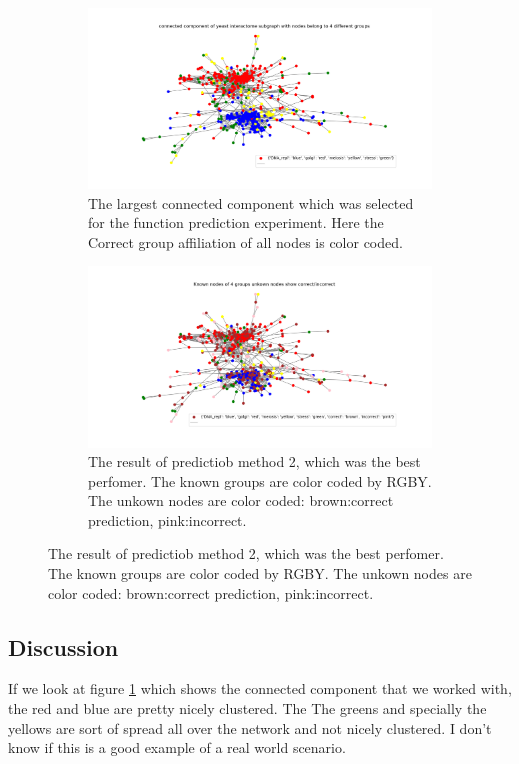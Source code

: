 \documentclass[a4paper,10pt]{article}
\theoremstyle{definition}
\theoremstyle{remark}
\theoremstyle{plain}
\begin{document}
\begin{figure}
\centering
\begin{subfigure}[b]{\textwidth}
\includegraphics[width=\textwidth]{connected component of yeast interactome subgraph with nodes belong to 4 different groups.png}
\caption{The largest connected component which was selected for the function
prediction experiment. Here the Correct group affiliation of all nodes is color
coded.}
\label{fig:largest_connected_comp}
\end{subfigure}
\begin{subfigure}[b]{\textwidth}
\includegraphics[width=\textwidth]{method2_true_false_clustering_on_4_groups_with_ordering_and_update.png}
\caption{The result of predictiob method 2, which was the best perfomer. 
The known groups are color coded by RGBY. The unkown nodes are color
coded: brown:correct prediction, pink:incorrect.}
\label{fig:my_prediction}
\end{subfigure}
\end{figure}

\subsection{Discussion}
If we look at figure \ref{fig:largest_connected_comp} which shows the connected
component that we worked with, the red and blue are pretty nicely clustered. The
The greens and specially the yellows are sort of spread all over the network and
not nicely clustered. I don't know if this is a good example of a real world
scenario.
\end{document}
